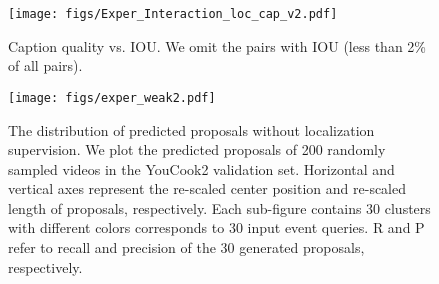 \begin{figure}[t]
    \centering
    \texttt{[image: figs/Exper\_Interaction\_loc\_cap\_v2.pdf]}
\caption{Caption quality vs. IOU.  We omit the pairs with IOU (less than 2\% of all pairs).}
\label{fig:Interact} 
\end{figure}

\begin{figure*}
    \centering
    \texttt{[image: figs/exper\_weak2.pdf]}
    \caption{The distribution of predicted proposals without localization supervision. We plot the predicted proposals of 200 randomly sampled videos in the YouCook2 validation set. Horizontal and vertical axes represent the re-scaled center position and re-scaled length of proposals, respectively. Each sub-figure contains 30 clusters with different colors corresponds to 30 input event queries. R and P refer to recall and precision of the 30 generated proposals, respectively.}
    \label{fig:weak}
\end{figure*}




